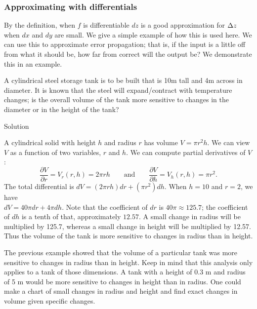 \subsubsection{Approximating with differentials}

By the definition, when $f$ is differentiable $dz$ is a good approximation for $\Delta z$ when $dx$ and $dy$ are small. We give a simple example of how this is used here.  We can use this to approximate error propagation; that is, if the input is a little off from what it should be, how far from correct will the output be? We demonstrate this in an example.

\begin{example}\label{ex_totaldiff4}
A cylindrical steel storage tank is to be built that is 10m tall and 4m across in diameter. It is known that the steel will expand/contract with temperature changes; is the overall volume of the tank more sensitive to changes in the diameter or in the height of the tank?

Solution 

A cylindrical solid with height $h$ and radius $r$ has volume $V = \pi r^2h$. We can view $V$ as a function of two variables, $r$ and $h$. We can compute partial derivatives of $V$:
$$\frac{\partial V}{\partial r} = V_r(r,h) = 2\pi rh \qquad \text{and}\qquad \frac{\partial V}{\partial h} = V_h(r,h) = \pi r^2.$$
The total differential is $dV = (2\pi rh)dr + (\pi r^2)dh.$ When $h = 10$ and $r = 2$, we have \\ $dV = 40\pi dr + 4\pi dh$.
Note that the coefficient of $dr$ is $40\pi\approx 125.7$; the coefficient of $dh$ is a tenth of that, approximately $12.57$. A small change in radius will be multiplied by 125.7, whereas a small change in height will be multiplied by 12.57. Thus the volume of the tank is more sensitive to changes in radius than in height.
\end{example}


The previous example showed that the volume of a particular tank was more sensitive to changes in radius than in height. Keep in mind that this analysis only applies to a tank of those dimensions. A tank with a height of 0.3 m and radius of 5 m would be more sensitive to changes in height than in radius. One could make a chart of small changes in radius and height and find exact changes in volume given specific changes. %


